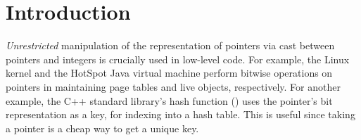 \section{Introduction}
%

\emph{Unrestricted} manipulation of the representation of pointers via cast between pointers and
integers is crucially used in low-level code.  For example, the Linux kernel and the HotSpot Java
virtual machine perform bitwise operations on pointers in maintaining page tables and live objects,
respectively.  For another example, the C++ standard library's hash function () uses
the pointer's bit representation as a key, \eg{} for indexing into a hash table.  This is useful
since taking a pointer is a cheap way to get a unique key.


%



